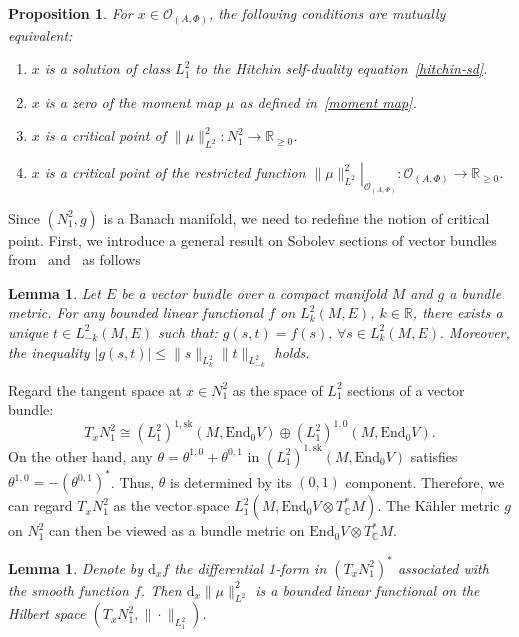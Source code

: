 \documentclass[a4paper]{amsart}
\newtheorem{lemma}[theorem]{Lemma}
\newtheorem{prop}[theorem]{Proposition}
\theoremstyle{definition}
\theoremstyle{remark}
\numberwithin{equation}{section}
\begin{document}
\begin{prop}\label{eq-conditions}
For $x \in \mathcal{O}_{(A, \Phi)}$, the following conditions are mutually equivalent:
\begin{enumerate}
    \item $x$ is a solution of class $L_1^2$ to the Hitchin self-duality equation~\eqref{hitchin-sd}.
    \item $x$ is a zero of the moment map $\mu$ as defined in~\eqref{moment map}.
    \item $x$ is a critical point of $\|\mu\|_{L^2}^2: N_1^2 \to \mathbb{R}_{\geq0}$.
    \item $x$ is a critical point of the restricted function $\left.\|\mu\|_{L^2}^2\right|_{\mathcal{O}_{(A, \Phi)}}: \mathcal{O}_{(A, \Phi)} \to \mathbb{R}_{\geq0}$.
\end{enumerate}
\end{prop}

Since $(N_1^2, g)$ is a Banach manifold, we need to redefine the notion of critical point. First, we introduce a general result on Sobolev sections of vector bundles from~\cite[Section 4.1]{wells2008differential} and~\cite[Chapter~4,~Proposition 3.2]{taylorpartial} as follows

\begin{lemma}\label{dualsobolev}
Let $E$ be a vector bundle over a compact manifold $M$ and $g$ a bundle metric. For any bounded linear functional $f$ on $L_k^2(M, E)$, $k \in \mathbb{R}$, there exists a unique $t \in L_{-k}^2(M, E)$ such that: $g(s, t) = f(s),  \,\forall s \in L_k^2(M, E).$ Moreover, the inequality $|g(s, t)| \leq \|s\|_{L_k^2} \|t\|_{L_{-k}^2}$ holds.
\end{lemma}

Regard the tangent space at $x \in N_1^2$ as the space of $L_1^2$ sections of a vector bundle:  
\[
T_x N_1^2 \cong (L_1^2)^{1, \mathrm{sk}}(M, \mathrm{End}_0 V) \oplus (L_1^2)^{1,0}(M, \mathrm{End}_0 V).
\]
On the other hand, any $\theta = \theta^{1,0} + \theta^{0,1}$ in $(L_1^2)^{1, \mathrm{sk}}(M, \mathrm{End}_0 V)$ satisfies $\theta^{1,0} = -\left(\theta^{0,1}\right)^*$. Thus, $\theta$ is determined by its $(0,1)$ component. Therefore, we can regard $T_x N_1^2$ as the vector space $L_1^2(M, \mathrm{End}_0 V \otimes T^*_{\mathbb{C}} M)$.  
The Kähler metric $g$ on $N_1^2$ can then be viewed as a bundle metric on $\mathrm{End}_0 V \otimes T^*_{\mathbb{C}} M$.

\begin{lemma}
Denote by $\mathrm{d}_x f$ the differential 1-form in $(T_x N_1^2)^*$ associated with the smooth function $f$. Then $\mathrm{d}_x \|\mu\|^2_{L^2}$ is a bounded linear functional on the Hilbert space $(T_x N_1^2, \|\cdot\|_{L_1^2})$.
\end{lemma}
\end{document}

